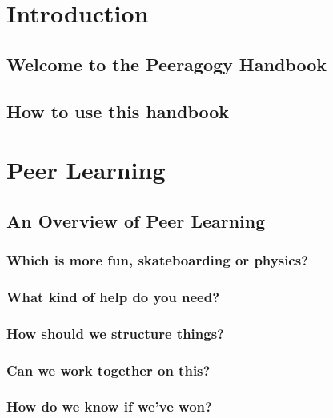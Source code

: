 \documentclass[ebook, 12pt, twoside]{memoir}
\newcommand\blankpage{%
    \null
    \thispagestyle{empty}%
    \addtocounter{page}{-1}%
    \newpage}
\begin{document}
\frontmatter
\pagestyle{empty}
\thispagestyle{empty}
\setcounter{page}{-1}
{
\changepage{15mm}{}{}{}{}{-15mm}{}{}{}{}{}{}{}{}
\tableofcontents*
}

\mainmatter

\part{Introduction} %
\pagestyle{companion}
\chapter[\textbf{Welcome!}]{Welcome to the Peeragogy Handbook}
%

%
\chapter[\textbf{How to use this handbook}]{How to use this handbook}
%


\part{Peer Learning} %
%
\chapter[\textbf{An Overview}]{An Overview of Peer Learning}

%
\section*{Which is more fun, skateboarding or physics?}

%
\section*{What kind of help do you need?}

%
\section*{How should we structure things?}

%
\section*{Can we work together on this?}

%
\section*{How do we know if we've won?}

\end{document}
